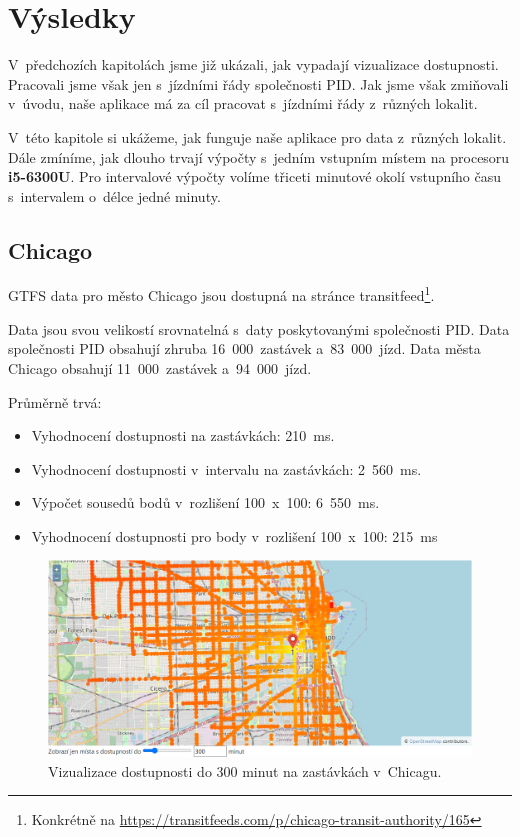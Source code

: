 \chapter{Výsledky}

V~předchozích kapitolách jsme již ukázali, jak vypadají vizualizace dostupnosti. Pracovali jsme však jen s~jízdními řády společnosti PID. Jak jsme však zmiňovali v~úvodu, naše aplikace má za cíl pracovat s~jízdními řády z~různých lokalit.

V~této kapitole si ukážeme, jak funguje naše aplikace pro data z~různých lokalit. Dále zmíníme, jak dlouho trvají výpočty s~jedním vstupním místem na procesoru \textbf{i5-6300U}. Pro intervalové výpočty volíme třiceti minutové okolí vstupního času s~intervalem o~délce jedné minuty.


\section{Chicago}

GTFS data pro město Chicago jsou dostupná na stránce transitfeed\footnote{Konkrétně na \url{https://transitfeeds.com/p/chicago-transit-authority/165}}.

Data jsou svou velikostí srovnatelná s~daty poskytovanými společnosti PID. Data společnosti PID obsahují zhruba 16~000~zastávek a~83~000~jízd. Data města Chicago obsahují 11~000~zastávek a~94~000~jízd.

Průměrně trvá:
\begin{itemize}
    \item Vyhodnocení dostupnosti na zastávkách: 210~ms.
    
    \item Vyhodnocení dostupnosti v~intervalu na zastávkách: 2~560~ms.
    
    \item Výpočet sousedů bodů v~rozlišení 100~x~100: 6~550~ms.
    
    \item Vyhodnocení dostupnosti pro body v~rozlišení 100~x~100: 215~ms
\end{itemize}


\begin{figure}[ht]
    \centering
    \includegraphics[width=\textwidth]{../img/Chicago-zastavky.png}
    \caption{Vizualizace dostupnosti do 300 minut na zastávkách v~Chicagu.}
    \label{fig:Chicago-zastavky}
\end{figure}

